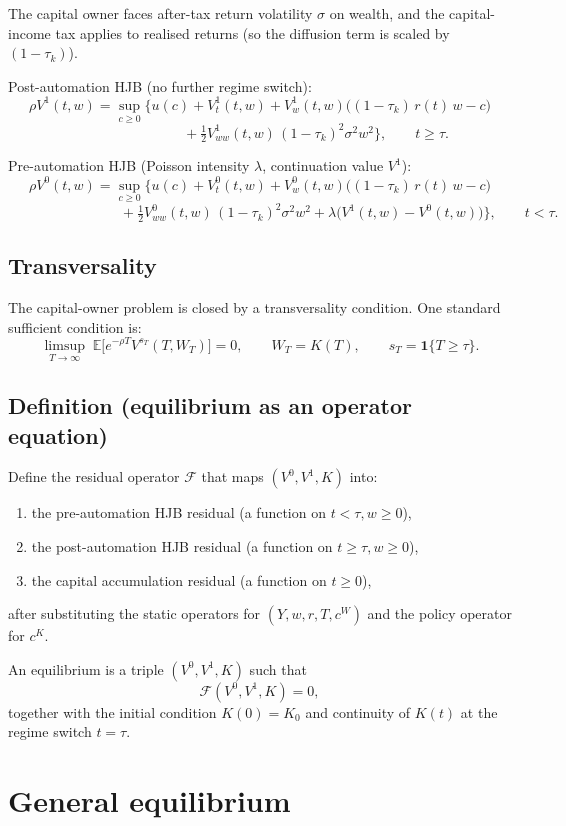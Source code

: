 \documentclass{article}
\begin{document}
The capital owner faces after-tax return volatility $\sigma$ on wealth, and the capital-income tax applies to realised returns (so the diffusion term is scaled by $(1-\tau_k)$).

Post-automation HJB (no further regime switch):
$$
\rho V^1(t,w)
=
\sup_{c\ge 0}\Big\{
u(c)
+ V^1_t(t,w)
+ V^1_w(t,w)\big((1-\tau_k)\,r(t)\,w - c\big)
$$
$$
\qquad\qquad\qquad\qquad
+ \tfrac12 V^1_{ww}(t,w)\,(1-\tau_k)^2\sigma^2 w^2
\Big\},
\qquad t\ge \tau.
$$

Pre-automation HJB (Poisson intensity $\lambda$, continuation value $V^1$):
$$
\rho V^0(t,w)
=
\sup_{c\ge 0}\Big\{
u(c)
+ V^0_t(t,w)
+ V^0_w(t,w)\big((1-\tau_k)\,r(t)\,w - c\big)
$$
$$
\qquad\qquad\qquad\qquad
+ \tfrac12 V^0_{ww}(t,w)\,(1-\tau_k)^2\sigma^2 w^2
+ \lambda\big(V^1(t,w)-V^0(t,w)\big)
\Big\},
\qquad t<\tau.
$$

\subsection*{Transversality}

The capital-owner problem is closed by a transversality condition. One standard sufficient condition is:
$$
\limsup_{T\to\infty}\; \mathbb{E}\big[e^{-\rho T} V^{s_T}(T,W_T)\big]=0,
\qquad W_T=K(T),
\qquad s_T=\mathbf{1}\{T\ge\tau\}.
$$

\subsection*{Definition (equilibrium as an operator equation)}

Define the residual operator $\mathcal{F}$ that maps $(V^0,V^1,K)$ into:
\begin{enumerate}
\item the pre-automation HJB residual (a function on $t<\tau, w\ge 0$),
\item the post-automation HJB residual (a function on $t\ge \tau, w\ge 0$),
\item the capital accumulation residual (a function on $t\ge 0$),
\end{enumerate}
after substituting the static operators for $(Y,w,r,T,c^W)$ and the policy operator for $c^K$.

An equilibrium is a triple $(V^0,V^1,K)$ such that
$$
\mathcal{F}(V^0,V^1,K)=0,
$$
together with the initial condition $K(0)=K_0$ and continuity of $K(t)$ at the regime switch $t=\tau$.

\section*{General equilibrium}
\end{document}
